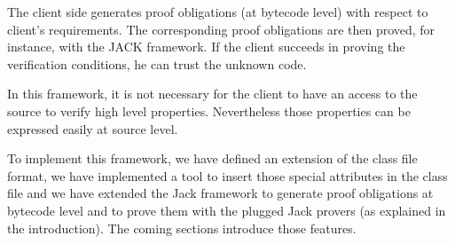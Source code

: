 The client side generates proof obligations (at bytecode level) with respect to client's requirements. 
The corresponding proof obligations are then proved, for instance, with the JACK framework. If the client succeeds in proving 
the verification conditions, he can trust the unknown code. 

In this framework, it is not necessary for the client to have an access to the source to verify high level properties. 
Nevertheless those properties can be expressed easily at source level.

To implement this framework, we have defined an extension of the class file format, we have implemented a tool to insert 
those special attributes in the class file and we have extended the Jack framework to generate proof obligations at bytecode 
level and to prove them with the plugged Jack provers (as explained in the introduction). 
The coming sections introduce those features.  

